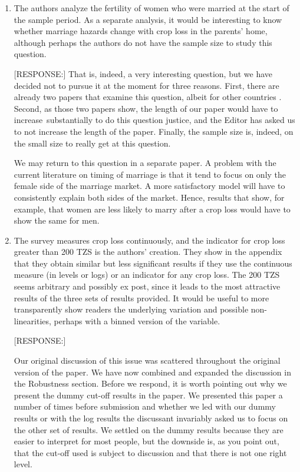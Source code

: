 \documentclass[letterpaper,12pt]{article}
\begin{document}
\begin{enumerate}




\item The authors analyze the fertility of women who were married at the
start of the sample period. As a separate analysis, it would be
interesting to know whether marriage hazards change with crop loss in
the parents' home, although perhaps the authors do not have the sample
size to study this question.

[RESPONSE:] That is, indeed, a very interesting question, but we have 
decided not to pursue it at the moment for three reasons.
First, there are already two papers that examine this question, 
albeit for other countries \citet{mbiti08,Hoogeveen2011}.
Second, as those two papers show, the length of our paper would have
to increase substantially to do this question justice, and the Editor
has asked us to not increase the length of the paper.
Finally, the sample size is, indeed, on the small size to really get 
at this question.

We may return to this question in a separate paper.
A problem with the current literature on timing of marriage
is that it tend to focus on only the female side of the marriage market.
A more satisfactory model will have to consistently explain both sides 
of the market.
Hence, results that show, for example, that women are less likely to
marry after a crop loss would have to show the same for men. 


\item The survey measures crop loss continuously, and the indicator for
crop loss greater than 200 TZS is the authors' creation. They show in
the appendix that they obtain similar but less significant results if
they use the continuous measure (in levels or logs) or an indicator for
any crop loss. The 200 TZS seems arbitrary and possibly ex post, since
it leads to the most attractive results of the three sets of results
provided. It would be useful to more transparently show readers the
underlying variation and possible non-linearities, perhaps with a binned
version of the variable.

[RESPONSE:]

Our original discussion of this issue was scattered throughout the
original version of the paper.
We have now combined and expanded the discussion in the
Robustness section.
Before we respond, it is worth pointing out why we present the dummy
cut-off results in the paper.
We presented this paper a number of times before submission and whether 
we led with our dummy results or with the log results the discussant 
invariably asked us to focus on the other set of results.
We settled on the dummy results because they are easier to interpret 
for most people, but the downside is, as you point out, that the 
cut-off used is subject to discussion and that there is not one right level.


\end{enumerate}
\end{document}
